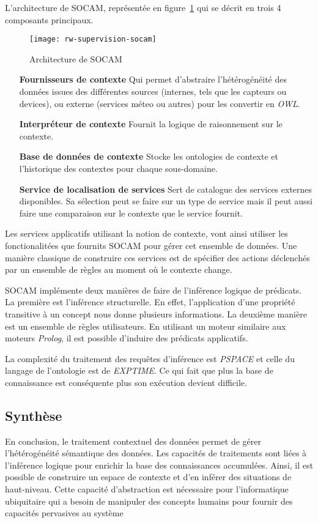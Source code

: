 L'architecture de SOCAM, représentée en figure~\ref{fig:rw:supervision:socam} qui se décrit en trois 4 composants principaux.
\begin{figure}[ht]
    \centering
    \texttt{[image: rw-supervision-socam]}
    \caption{Architecture de SOCAM}\label{fig:rw:supervision:socam}
\end{figure}
\begin{itemize}
	\item[\textbf{Fournisseurs de contexte}] Qui permet d'abstraire l'hétérogénéité des données issues des différentes sources (internes, tels que les capteurs ou devices), ou externe (services méteo ou autres) pour les convertir en \textit{OWL}.
    \item[\textbf{Interpréteur de contexte}] Fournit la logique de raisonnement sur le contexte.
    \item[\textbf{Base de données de contexte}] Stocke les ontologies de contexte et l'historique des contextes pour chaque sous-domaine.
    \item[\textbf{Service de localisation de services}] Sert de catalogue des services externes disponibles. Sa sélection peut se faire sur un type de service mais il peut aussi faire une comparaison sur le contexte que le service fournit.
\end{itemize}
Les services applicatifs utilisant la notion de contexte, vont ainsi utiliser les fonctionalitées que fournits SOCAM pour gérer cet ensemble de données. Une manière classique de construire ces services est de spécifier des actions déclenchés par un ensemble de règles au moment où le contexte change.

SOCAM implémente deux manières de faire de l'inférence logique de prédicats. La première est l'inférence structurelle. En effet, l'application d'une propriété transitive à un concept nous donne plusieurs informations. La deuxième manière est un ensemble de règles utilisateurs. En utilisant un moteur similaire aux moteurs \textit{Prolog}, il est possible d'induire des prédicats applicatifs. 

La complexité du traitement des requêtes d'inférence est \textit{PSPACE} et celle du langage de l'ontologie est de \textit{EXPTIME}. Ce qui fait que plus la base de connaissance est conséquente plus son exécution devient difficile.
\subsection{Synthèse}
En conclusion, le traitement contextuel des données permet de gérer l'hétérogénéité sémantique des données. Les capacités de traitements sont liées à l'inférence logique pour enrichir la base des connaissances accumulées. Ainsi, il est possible de construire un espace de contexte et d'en inférer des situations de haut-niveau. Cette capacité d'abstraction est nécessaire pour l'informatique ubiquitaire qui a besoin de manipuler des concepts humains pour fournir des capacités pervasives au système

